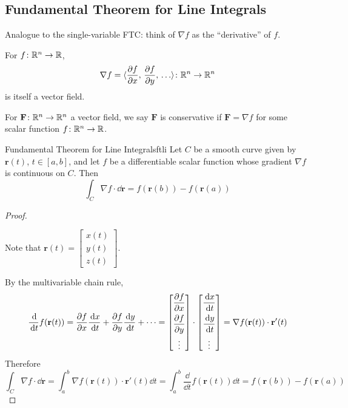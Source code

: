 \subsection{Fundamental Theorem for Line Integrals}

Analogue to the single-variable FTC: think of $\nabla f$ as the ``derivative'' of $f$.

\begin{remark}
  For $f\colon\mathbb{R}^n\to\mathbb{R}$,
  \[
    \nabla f = \langle \frac{\partial f}{\partial x},\,\frac{\partial f}{\partial y},\,\ldots \rangle\colon \mathbb{R}^n\to\mathbb{R}^n
  \]
  is itself a vector field.
\end{remark}

\begin{remark}
  For $\mathbf{F}\colon\mathbb{R}^n\to\mathbb{R}^n$ a vector field, we say $\mathbf{F}$ is conservative if
  $\mathbf{F} = \nabla f$ for some scalar function $f\colon\mathbb{R}^n\to\mathbb{R}$.
\end{remark}

\begin{theorem}{Fundamental Theorem for Line Integrals}{ftli}
  Let $C$ be a smooth curve given by $\mathbf{r}(t)$, $t\in[a,b]$, and let $f$ be a
  differentiable scalar function whose gradient $\nabla f$ is continuous on $C$. Then
  \[
    \int_C \nabla f\cdot \dd{\mathbf{r}} = f(\mathbf{r}(b)) - f(\mathbf{r}(a))
  \]
\end{theorem}

\begin{proof}

  \begin{remark}
    Note that $\mathbf{r}(t) =
      \begin{bmatrix}
        x(t) \\y(t)\\z(t)
      \end{bmatrix}
    $.
  \end{remark}

  By the multivariable chain rule,
  \[
    \frac{\,\mathrm{d}}{\,\mathrm{d}t}f(\mathbf{r}(t))
    = \frac{\partial f}{\partial x}\frac{\,\mathrm{d}x}{\,\mathrm{d}t} + \frac{\partial f}{\partial y}\frac{\,\mathrm{d}y}{\,\mathrm{d}t} + \cdots
    =
    \begin{bmatrix}
      \dfrac{\partial f}{\partial x} \\[8pt] \dfrac{\partial f}{\partial y} \\[8pt] \vdots
    \end{bmatrix}
    \cdot
    \begin{bmatrix}
      \dfrac{\,\mathrm{d}x}{\,\mathrm{d}t} \\[8pt] \dfrac{\,\mathrm{d}y}{\,\mathrm{d}t} \\[8pt] \vdots
    \end{bmatrix}
    = \nabla f(\mathbf{r}(t))\cdot\mathbf{r}'(t)
  \]
  Therefore
  \[
    \int_C \nabla f\cdot \dd{\mathbf{r}}
    = \int_a^b \nabla f(\mathbf{r}(t))\cdot\mathbf{r}'(t)\dd{t}
    = \int_a^b \frac{\dd{}}{\dd{t}}f(\mathbf{r}(t))\dd{t}
    = f(\mathbf{r}(b)) - f(\mathbf{r}(a))
  \]
\end{proof}

